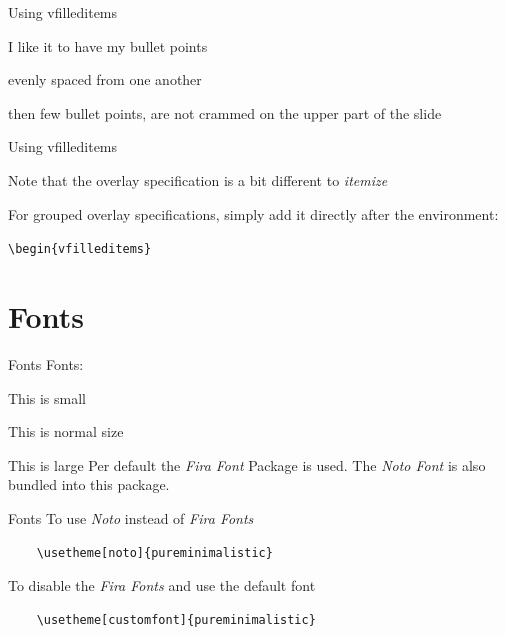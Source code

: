 \documentclass{beamer}
\begin{document}
\begin{frame}{Using vfilleditems}
    \begin{vfilleditems}
        \item I like it to have my bullet points
        \item evenly spaced from one another
        \item then few bullet points, are not crammed on
        the upper part of the slide
    \end{vfilleditems}
\end{frame}

\begin{frame}{Using vfilleditems}
    \begin{vfilleditems}
        \item Note that the overlay specification
        is a bit different to \emph{itemize}
        \item For grouped overlay specifications, simply add it
        directly after the environment:
        \begin{vfilleditems}
            \item \texttt{\textbackslash{}begin\{vfilleditems\}<+->}
        \end{vfilleditems}
    \end{vfilleditems}
\end{frame}


\section{Fonts}
\begin{frame}[fragile]{Fonts}
    Fonts:

    {\small This is small}

    This is normal size

        {\large This is large}
    \vfill
    Per default the \emph{Fira Font} Package is
    used. The \emph{Noto Font} is also bundled into this
    package.
\end{frame}

\begin{frame}[fragile]{Fonts}
    To use \emph{Noto} instead of \emph{Fira Fonts}
    \begin{verbatim}
    \usetheme[noto]{pureminimalistic}
  \end{verbatim}
    \vfill
    To disable the \emph{Fira Fonts} and use the default font
    \begin{verbatim}
    \usetheme[customfont]{pureminimalistic}
  \end{verbatim}
\end{frame}
\end{document}
